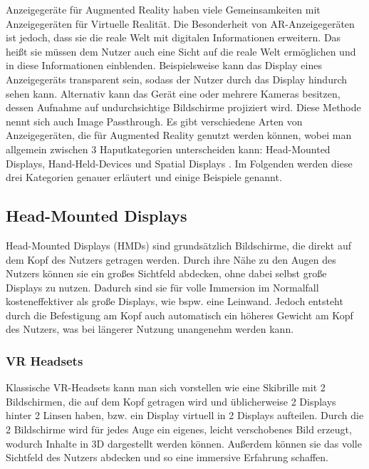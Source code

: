   Anzeigegeräte für Augmented Reality haben viele Gemeinsamkeiten mit Anzeigegeräten für Virtuelle Realität.
  Die Besonderheit von AR-Anzeigegeräten ist jedoch, dass sie die reale Welt mit digitalen Informationen erweitern.
  Das heißt sie müssen dem Nutzer auch eine Sicht auf die reale Welt ermöglichen und in diese Informationen einblenden.
  Beispielsweise kann das Display eines Anzeigegeräts transparent sein, sodass der Nutzer durch das Display hindurch sehen kann.
  Alternativ kann das Gerät eine oder mehrere Kameras besitzen, dessen Aufnahme auf undurchsichtige Bildschirme projiziert wird.
  Diese Methode nennt sich auch Image Passthrough.
  Es gibt verschiedene Arten von Anzeigegeräten, die für Augmented Reality genutzt werden können, wobei man allgemein zwischen 3 Haputkategorien unterscheiden kann: Head-Mounted Displays, Hand-Held-Devices und Spatial Displays \autocite[][S. 346]{Carmigniani2011}.
  Im Folgenden werden diese drei Kategorien genauer erläutert und einige Beispiele genannt.

  \subsection{Head-Mounted Displays}
    \label{section:hmds}
    Head-Mounted Displays (HMDs) sind grundsätzlich Bildschirme, die direkt auf dem Kopf des Nutzers getragen werden.
    Durch ihre Nähe zu den Augen des Nutzers können sie ein großes Sichtfeld abdecken, ohne dabei selbst große Displays zu nutzen.
    Dadurch sind sie für volle Immersion im Normalfall kosteneffektiver als große Displays, wie bspw. eine Leinwand.
    Jedoch entsteht durch die Befestigung am Kopf auch automatisch ein höheres Gewicht am Kopf des Nutzers, was bei längerer Nutzung unangenehm werden kann.


    \subsubsection{VR Headsets}

    Klassische VR-Headsets kann man sich vorstellen wie eine Skibrille mit 2 Bildschirmen, die auf dem Kopf getragen wird und üblicherweise 2 Displays hinter 2 Linsen haben, bzw. ein Display virtuell in 2 Displays aufteilen.
    Durch die 2 Bildschirme wird für jedes Auge ein eigenes, leicht verschobenes Bild erzeugt, wodurch Inhalte in 3D dargestellt werden können.
    Außerdem können sie das volle Sichtfeld des Nutzers abdecken und so eine immersive Erfahrung schaffen.

